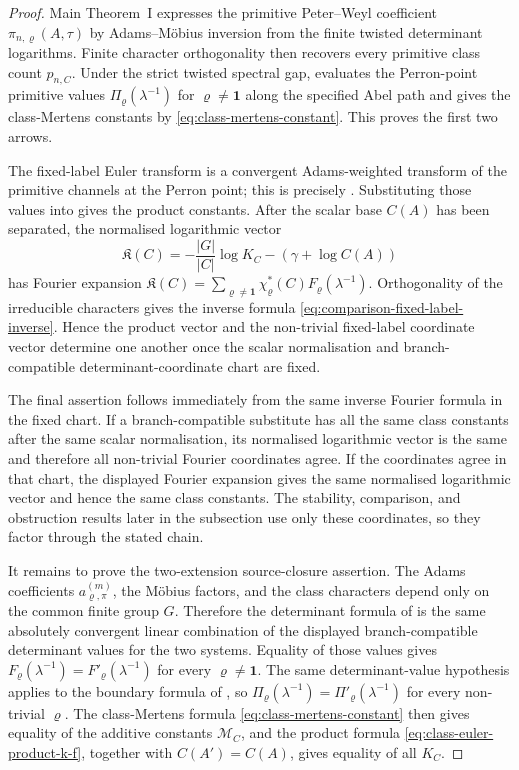 \documentclass[11pt,a4paper]{amsart}
\theoremstyle{plain}
\theoremstyle{definition}
\theoremstyle{remark}
\begin{document}
\begin{proof}
  Main Theorem~I expresses the primitive Peter--Weyl coefficient
  \(\pi_{n,\varrho}(A,\tau)\) by Adams--M\"obius inversion from the finite
  twisted determinant logarithms.  Finite character orthogonality then
  recovers every primitive class count \(p_{n,C}\).  Under the strict twisted
  spectral gap,  evaluates the Perron-point
  primitive values \(\Pi_\varrho(\lambda^{-1})\) for
  \(\varrho\ne\mathbf1\) along the specified Abel path and gives the
  class-Mertens constants by \eqref{eq:class-mertens-constant}.  This proves
  the first two arrows.

  The fixed-label Euler transform is a convergent Adams-weighted transform of
  the primitive channels at the Perron point; this is precisely
  .  Substituting those values into
   gives the product constants.  After
  the scalar base \(C(A)\) has been separated, the normalised logarithmic
  vector
  \[
    \mathfrak K(C)=-\frac{|G|}{|C|}\log K_C-(\gamma+\log C(A))
  \]
  has Fourier expansion
  \(\mathfrak K(C)=\sum_{\varrho\ne\mathbf1}
  \chi_\varrho^\ast(C)F_\varrho(\lambda^{-1})\).  Orthogonality of the
  irreducible characters gives the inverse formula
  \eqref{eq:comparison-fixed-label-inverse}.  Hence the product vector and
  the non-trivial fixed-label coordinate vector determine one another once
  the scalar normalisation and branch-compatible determinant-coordinate chart
  are fixed.

  The final assertion follows immediately from the same inverse Fourier
  formula in the fixed chart.  If a branch-compatible substitute has all the
  same class constants after the same scalar normalisation, its normalised
  logarithmic vector is the same and therefore all non-trivial Fourier
  coordinates agree.  If the coordinates agree in that chart, the displayed
  Fourier expansion gives the same normalised logarithmic vector and hence the
  same class constants.  The stability, comparison, and obstruction results
  later in the subsection use only these coordinates, so they factor through
  the stated chain.

  It remains to prove the two-extension source-closure assertion.  The Adams
  coefficients \(a_{\varrho,\pi}^{(m)}\), the M\"obius factors, and the class
  characters depend only on the common finite group \(G\).  Therefore the
  determinant formula of  is the
  same absolutely convergent linear combination of the displayed
  branch-compatible determinant values for the two systems.  Equality of
  those values gives
  \(F_\varrho(\lambda^{-1})=F'_{\varrho}(\lambda^{-1})\) for every
  \(\varrho\ne\mathbf1\).  The same determinant-value hypothesis applies to
  the boundary formula of ,
  so
  \(\Pi_\varrho(\lambda^{-1})=\Pi'_{\varrho}(\lambda^{-1})\) for every
  non-trivial \(\varrho\).  The class-Mertens formula
  \eqref{eq:class-mertens-constant} then gives equality of the additive
  constants \(\mathcal M_C\), and the product formula
  \eqref{eq:class-euler-product-k-f}, together with
  \(C(A')=C(A)\), gives equality of all \(K_C\).


\end{proof}
\end{document}
